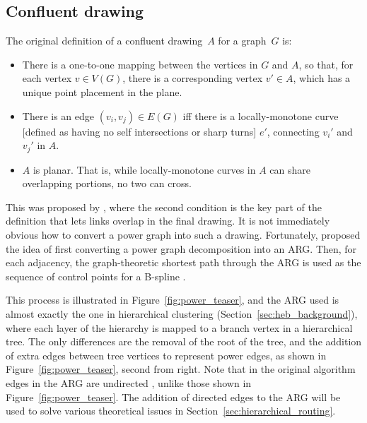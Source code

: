 \subsection{Confluent drawing}
\label{sec:confluent_definition}
The original definition of a confluent drawing~$A$ for a graph~$G$ is:
\begin{mdframed}[backgroundcolor=WhiteSmoke]
\begin{itemize}[leftmargin=*]
  \item There is a one-to-one mapping between the vertices in $G$ and $A$, so that, for each vertex $v\in V(G)$, there is a corresponding vertex $v'\in A$, which has a unique point placement in the plane.
  \item There is an edge $(v_i,v_j) \in E(G)$ iff there is a locally-monotone curve [defined as having no self intersections or sharp turns] $e'$, connecting $v_i'$ and $v_j'$ in $A$. 
  \item $A$ is planar. That is, while locally-monotone curves in $A$ can share overlapping portions, no two can cross.
\end{itemize}
\end{mdframed}
This was proposed by \citet{Dickerson2005}, where the second condition is the key part of the definition that lets links overlap in the final drawing.
It is not immediately obvious how to convert a power graph into such a drawing. Fortunately, \citet{Bach2017} proposed the idea of first converting a power graph decomposition into an ARG. Then, for each adjacency, the graph-theoretic shortest path through the ARG is used as the sequence of control points for a B-spline \citep{Sederberg2005}.

This process is illustrated in Figure~\ref{fig:power_teaser}, and the ARG used is almost exactly the one in hierarchical clustering (Section~\ref{sec:heb_background}), where each layer of the hierarchy is mapped to a branch vertex in a hierarchical tree.
The only differences are the removal of the root of the tree, and the addition of extra edges between tree vertices to represent power edges, as shown in Figure~\ref{fig:power_teaser}, second from right. Note that in the original algorithm edges in the ARG are undirected \citep{Bach2017}, unlike those shown in Figure~\ref{fig:power_teaser}.
The addition of directed edges to the ARG will be used to solve various theoretical issues in Section~\ref{sec:hierarchical_routing}.

